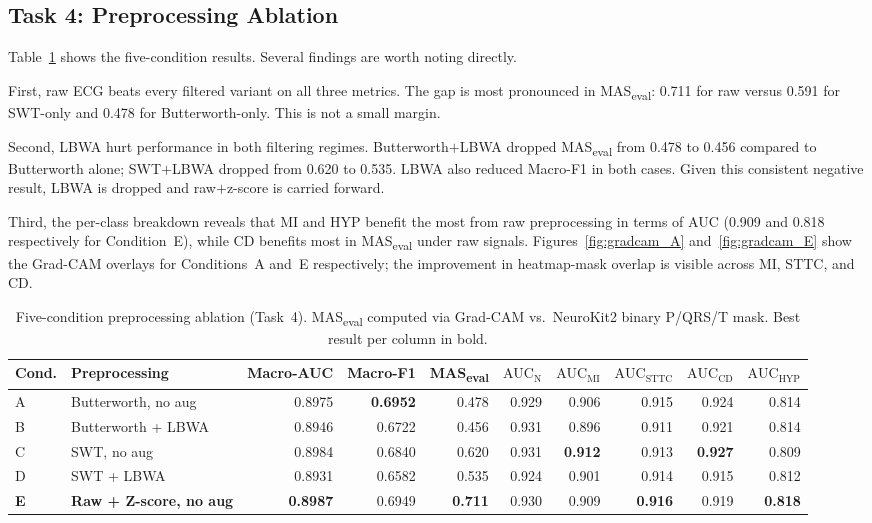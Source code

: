 \documentclass{article}
\begin{document}
\subsection{Task 4: Preprocessing Ablation}

Table~\ref{tab:ablation} shows the five-condition results. Several
findings are worth noting directly.

First, raw ECG beats every filtered variant on all three metrics.
The gap is most pronounced in MAS\textsubscript{eval}: 0.711 for
raw versus 0.591 for SWT-only and 0.478 for Butterworth-only. This
is not a small margin.

Second, LBWA hurt performance in both filtering regimes. Butterworth$+$LBWA
dropped MAS\textsubscript{eval} from 0.478 to 0.456 compared to
Butterworth alone; SWT$+$LBWA dropped from 0.620 to 0.535. LBWA
also reduced Macro-F1 in both cases. Given this consistent negative
result, LBWA is dropped and raw$+$z-score is carried forward.

Third, the per-class breakdown reveals that MI and HYP benefit the
most from raw preprocessing in terms of AUC (0.909 and 0.818
respectively for Condition~E), while CD benefits most in
MAS\textsubscript{eval} under raw signals. Figures~\ref{fig:gradcam_A}
and~\ref{fig:gradcam_E} show the Grad-CAM overlays for Conditions~A
and~E respectively; the improvement in heatmap-mask overlap is
visible across MI, STTC, and CD.

\begin{table}[t]
\caption{Five-condition preprocessing ablation (Task~4). MAS\textsubscript{eval}
computed via Grad-CAM vs.\ NeuroKit2 binary P/QRS/T mask. Best result per column
in bold.}
\label{tab:ablation}
\vskip 0.1in
\begin{center}
\begin{small}
\begin{tabular}{llrrrrrrrr}
\toprule
Cond. & Preprocessing & Macro-AUC & Macro-F1 & MAS\textsubscript{eval}
      & $\text{AUC}_\text{N}$ & $\text{AUC}_\text{MI}$ & $\text{AUC}_\text{STTC}$
      & $\text{AUC}_\text{CD}$ & $\text{AUC}_\text{HYP}$ \\
\midrule
A & Butterworth, no aug  & 0.8975 & \textbf{0.6952} & 0.478 & 0.929 & 0.906 & 0.915 & 0.924 & 0.814 \\
B & Butterworth + LBWA   & 0.8946 & 0.6722 & 0.456 & 0.931 & 0.896 & 0.911 & 0.921 & 0.814 \\
C & SWT, no aug          & 0.8984 & 0.6840 & 0.620 & 0.931 & \textbf{0.912} & 0.913 & \textbf{0.927} & 0.809 \\
D & SWT + LBWA           & 0.8931 & 0.6582 & 0.535 & 0.924 & 0.901 & 0.914 & 0.915 & 0.812 \\
\textbf{E} & \textbf{Raw + Z-score, no aug} & \textbf{0.8987} & 0.6949 & \textbf{0.711} & 0.930 & 0.909 & \textbf{0.916} & 0.919 & \textbf{0.818} \\
\bottomrule
\end{tabular}
\end{small}
\end{center}
\end{table}
\end{document}
